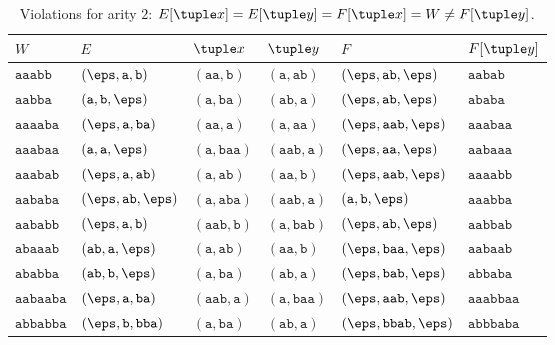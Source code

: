 \begin{table}[htbp]
\caption{Violations for arity $2$: $E[\tuple x]=E[\tuple y]=F[\tuple x]=W\ne F[\tuple y]$.}
\label{tab:singleton-certificates}
\centering
\scriptsize
\setlength{\tabcolsep}{3pt}
\renewcommand{\arraystretch}{1.05}
\begin{tabular}{@{}llllll@{}}
\hline
$W$ & $E$ & $\tuple x$ & $\tuple y$ & $F$ & $F[\tuple y]$\\
\hline
$\mathtt{aaabb}$ & $(\eps,\mathtt{a},\mathtt{b})$ & $(\mathtt{aa},\mathtt{b})$ & $(\mathtt{a},\mathtt{ab})$ & $(\eps,\mathtt{ab},\eps)$ & $\mathtt{aabab}$\\
$\mathtt{aabba}$ & $(\mathtt{a},\mathtt{b},\eps)$ & $(\mathtt{a},\mathtt{ba})$ & $(\mathtt{ab},\mathtt{a})$ & $(\eps,\mathtt{ab},\eps)$ & $\mathtt{ababa}$\\
$\mathtt{aaaaba}$ & $(\eps,\mathtt{a},\mathtt{ba})$ & $(\mathtt{aa},\mathtt{a})$ & $(\mathtt{a},\mathtt{aa})$ & $(\eps,\mathtt{aab},\eps)$ & $\mathtt{aaabaa}$\\
$\mathtt{aaabaa}$ & $(\mathtt{a},\mathtt{a},\eps)$ & $(\mathtt{a},\mathtt{baa})$ & $(\mathtt{aab},\mathtt{a})$ & $(\eps,\mathtt{aa},\eps)$ & $\mathtt{aabaaa}$\\
$\mathtt{aaabab}$ & $(\eps,\mathtt{a},\mathtt{ab})$ & $(\mathtt{a},\mathtt{ab})$ & $(\mathtt{aa},\mathtt{b})$ & $(\eps,\mathtt{aab},\eps)$ & $\mathtt{aaaabb}$\\
$\mathtt{aababa}$ & $(\eps,\mathtt{ab},\eps)$ & $(\mathtt{a},\mathtt{aba})$ & $(\mathtt{aab},\mathtt{a})$ & $(\mathtt{a},\mathtt{b},\eps)$ & $\mathtt{aaabba}$\\
$\mathtt{aababb}$ & $(\eps,\mathtt{a},\mathtt{b})$ & $(\mathtt{aab},\mathtt{b})$ & $(\mathtt{a},\mathtt{bab})$ & $(\eps,\mathtt{ab},\eps)$ & $\mathtt{aabbab}$\\
$\mathtt{abaaab}$ & $(\mathtt{ab},\mathtt{a},\eps)$ & $(\mathtt{a},\mathtt{ab})$ & $(\mathtt{aa},\mathtt{b})$ & $(\eps,\mathtt{baa},\eps)$ & $\mathtt{aabaab}$\\
$\mathtt{ababba}$ & $(\mathtt{ab},\mathtt{b},\eps)$ & $(\mathtt{a},\mathtt{ba})$ & $(\mathtt{ab},\mathtt{a})$ & $(\eps,\mathtt{bab},\eps)$ & $\mathtt{abbaba}$\\
$\mathtt{aabaaba}$ & $(\eps,\mathtt{a},\mathtt{ba})$ & $(\mathtt{aab},\mathtt{a})$ & $(\mathtt{a},\mathtt{baa})$ & $(\eps,\mathtt{aab},\eps)$ & $\mathtt{aaabbaa}$\\
$\mathtt{abbabba}$ & $(\eps,\mathtt{b},\mathtt{bba})$ & $(\mathtt{a},\mathtt{ba})$ & $(\mathtt{ab},\mathtt{a})$ & $(\eps,\mathtt{bbab},\eps)$ & $\mathtt{abbbaba}$\\
\hline
\end{tabular}
\end{table}

